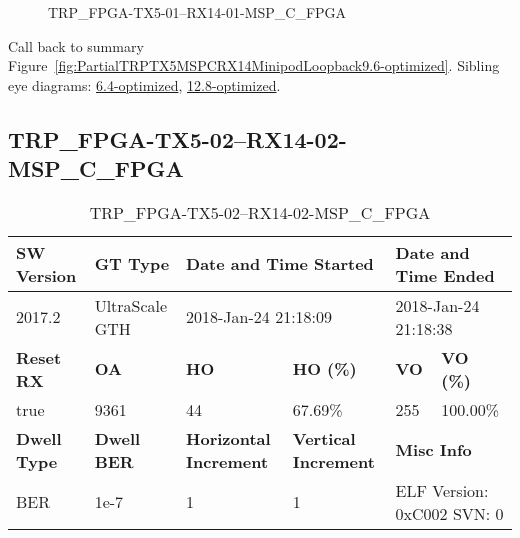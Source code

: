 \begin{figure}[h]
\caption{TRP\_FPGA-TX5-01--RX14-01-MSP\_C\_FPGA} \label{fig:TRPFPGATX501RX1401MSPCFPGA9.6-optimized}
\end{figure}

Call back to summary Figure~\ref{fig:PartialTRPTX5MSPCRX14MinipodLoopback9.6-optimized}.
Sibling eye diagrams: \hyperref[sec:TRPFPGATX501RX1401MSPCFPGA6.4-optimized]{6.4-optimized}, \hyperref[sec:TRPFPGATX501RX1401MSPCFPGA12.8-optimized]{12.8-optimized}.

\clearpage
\newpage


\subsection{TRP\_FPGA-TX5-02--RX14-02-MSP\_C\_FPGA}\label{sec:TRPFPGATX502RX1402MSPCFPGA9.6-optimized}

\begin{table}[h]
\centering
\caption{TRP\_FPGA-TX5-02--RX14-02-MSP\_C\_FPGA}
\label{tab:TRPFPGATX502RX1402MSPCFPGA9.6-optimized}
\begin{tabular}{@{}|l|l|l|l|l|l|@{}}
\toprule
\textbf{SW Version}                & \textbf{GT Type}   & \multicolumn{2}{l|}{\textbf{Date and Time Started}}            & \multicolumn{2}{l|}{\textbf{Date and Time Ended}}        \\ \midrule
2017.2                       & UltraScale GTH          & \multicolumn{2}{l|}{2018-Jan-24 21:18:09}                   & \multicolumn{2}{l|}{2018-Jan-24 21:18:38}               \\ \midrule
\textbf{Reset RX}                  & \textbf{OA} & \textbf{HO}   & \textbf{HO (\%)} & \textbf{VO} & \textbf{VO (\%)} \\ \midrule
true & 9361        & 44          & 67.69\%        & 255        & 100.00\%       \\ \midrule
\textbf{Dwell Type}                & \textbf{Dwell BER} & \textbf{Horizontal Increment} & \textbf{Vertical Increment}    & \multicolumn{2}{l|}{\textbf{Misc Info}}                  \\ \midrule
BER                            & 1e-7        & 1        & 1           & \multicolumn{2}{l|}{ELF Version: 0xC002 SVN: 0}                         \\ \bottomrule
\end{tabular}
\end{table}

